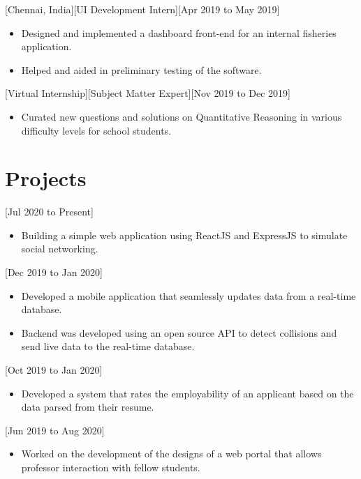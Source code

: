 \documentclass{article}
\begin{document}
[Chennai, India][UI Development Intern][Apr 2019 to May 2019]
\begin{itemize}
\item Designed and implemented a dashboard front-end for an internal fisheries application.
\item Helped and aided in preliminary testing of the software. 
\end{itemize}

[Virtual Internship][Subject Matter Expert][Nov 2019 to Dec 2019]
\begin{itemize}
\item Curated new questions and solutions on Quantitative Reasoning in various difficulty levels for school students.
\end{itemize}
 
\section{Projects}
[Jul 2020 to Present]
\begin{itemize}
\item Building a simple web application using ReactJS and ExpressJS to simulate social networking.
\end{itemize}

[Dec 2019 to Jan 2020]
\begin{itemize}
\item Developed a mobile application that seamlessly updates data from a real-time database.
\item Backend was developed using an open source API to detect collisions and send live data to the real-time database.
\end{itemize}

[Oct 2019 to Jan 2020]
\begin{itemize}
\item Developed a system that rates the employability of an applicant based on the data parsed from their resume.
\end{itemize}

[Jun 2019 to Aug 2020]
\begin{itemize}
\item Worked on the development of the designs of a web portal that allows professor interaction with fellow students.
\end{itemize}
\end{document}
